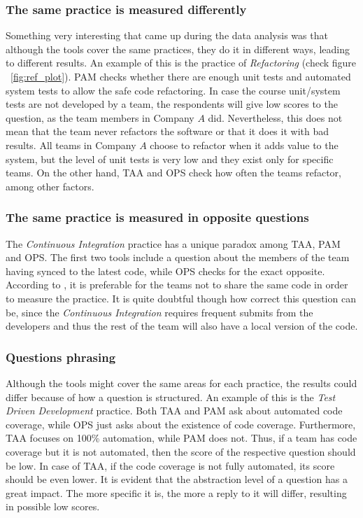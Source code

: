 \subsubsection{The same practice is measured differently}
Something very interesting that came up during the data analysis was that although the tools cover the same practices, they do it in different ways, leading to different results. An example of this is the practice of \textit{Refactoring} (check figure ~\ref{fig:ref_plot}). \ac{PAM} checks whether there are enough unit tests and automated system tests to allow the safe code refactoring. In case the course unit/system tests are not developed by a team, the respondents will give low scores to the question, as the team members in Company $A$ did. Nevertheless, this does not mean that the team never refactors the software or that it does it with bad results. All teams in Company $A$ choose to refactor when it adds value to the system, but the level of unit tests is very low and they exist only for specific teams. On the other hand, \ac{TAA} and \ac{OPS} check how often the teams refactor, among other factors.

\subsubsection{The same practice is measured in opposite questions}
\label{subsec:opposite_questions}
The \textit{Continuous Integration} practice has a unique paradox among \ac{TAA}, \ac{PAM} and \ac{OPS}. The first two tools include a question about the members of the team having synced to the latest code, while \ac{OPS} checks for the exact opposite. According to \citet{sventha_dissertation}, it is preferable for the teams not to share the same code in order to measure the practice. It is quite doubtful though how correct this question can be, since the \textit{Continuous Integration} requires frequent submits from the developers and thus the rest of the team will also have a local version of the code.

\subsubsection{Questions phrasing}
Although the tools might cover the same areas for each practice, the results could differ because of how a question is structured. An example of this is the \textit{Test Driven Development} practice. Both \ac{TAA} and \ac{PAM} ask about automated code coverage, while \ac{OPS} just asks about the existence of code coverage. Furthermore, \ac{TAA} focuses on 100\% automation, while \ac{PAM} does not. Thus, if a team has code coverage but it is not automated, then the score of the respective question should be low. In case of \ac{TAA}, if the code coverage is not fully automated, its score should be even lower. It is evident that the abstraction level of a question has a great impact. The more specific it is, the more a reply to it will differ, resulting in possible low scores.

